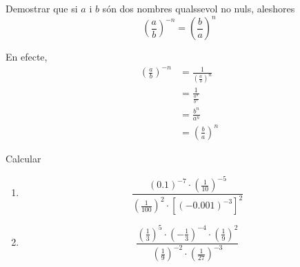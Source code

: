 \begin{exercici}
Demostrar que si $a$ i $b$ són dos nombres qualssevol no nuls,
aleshores%
\begin{equation*}
\left( \frac{a}{b}\right) ^{-n}=\left( \frac{b}{a}\right) ^{n}
\end{equation*}

\end{exercici}

\begin{solucio}
En efecte,%
\begin{align*}
\left( \frac{a}{b}\right) ^{-n} &=\frac{1}{\left( \frac{a}{b}\right) ^{n}}
\\
&=\frac{1}{\frac{a^{n}}{b^{n}}} \\
&=\frac{b^{n}}{a^{n}} \\
&=\left( \frac{b}{a}\right) ^{n}
\end{align*}
\end{solucio}

\begin{exercici}
Calcular

\begin{enumerate}
\item[a)] 
\begin{equation*}
\frac{(0.1)^{-7}\cdot \left( \frac{1}{10}\right) ^{-5}}{\left( \frac{1}{100}%
\right) ^{2}\cdot \left[ \left( -0.001\right) ^{-3}\right] ^{2}}
\end{equation*}

\item[b)] 
\begin{equation*}
\frac{\left( \frac{1}{3}\right) ^{5}\cdot \left( -\frac{1}{3}\right)
^{-4}\cdot \left( \frac{1}{9}\right) ^{2}}{\left( \frac{1}{9}\right)
^{-2}\cdot \left( \frac{1}{27}\right) ^{-3}}
\end{equation*}
\end{enumerate}

\end{exercici}

